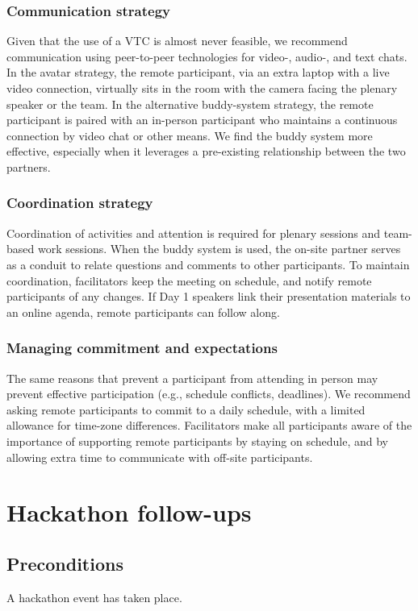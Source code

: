 \documentclass[11pt]{article}
\begin{document}
\subsubsection*{Communication strategy} Given that the use of a VTC is almost never feasible, we recommend communication using peer-to-peer technologies for video-, audio-, and text chats. In the avatar strategy, the remote participant, via an extra laptop with a live video connection, virtually sits in the room with the camera facing the plenary speaker or the team. In the alternative buddy-system strategy, the remote participant is paired with an in-person participant who maintains a continuous connection by video chat or other means. We find the buddy system more effective, especially when it leverages a pre-existing relationship between the two partners.  
\subsubsection*{Coordination strategy} Coordination of activities and attention is required for plenary sessions and team-based work sessions. When the buddy system is used, the on-site partner serves as a conduit to relate questions and comments to other participants. To maintain coordination, facilitators keep the meeting on schedule, and notify remote participants of any changes. If Day 1 speakers link their presentation materials to an online agenda, remote participants can follow along.  
\subsubsection*{Managing commitment and expectations} The same reasons that prevent a participant from attending in person may prevent effective participation (e.g., schedule conflicts, deadlines). We recommend asking remote participants to commit to a daily schedule, with a limited allowance for time-zone differences. Facilitators make all participants aware of the importance of supporting remote participants by staying on schedule, and by allowing extra time to communicate with off-site participants.  

\newpage
\section{Hackathon follow-ups}
\subsection{Preconditions}
A hackathon event has taken place. 
\end{document}
